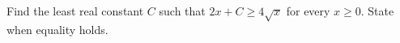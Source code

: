 Find the least real constant $C$ such that $2x+C\ge4\sqrt x$ for every $x\ge0$. State when equality holds.
